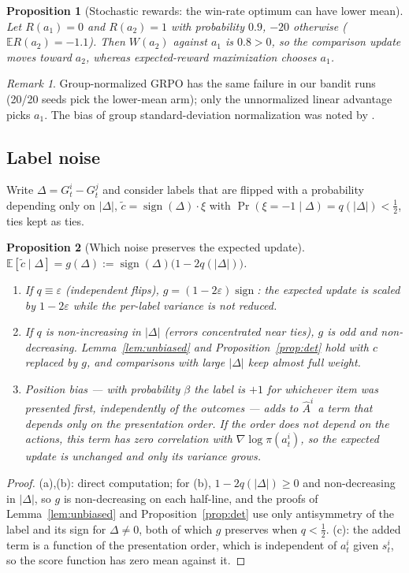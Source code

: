 \documentclass[11pt]{article}
\newtheorem{proposition}{Proposition}
\theoremstyle{remark}
\newtheorem{remark}{Remark}
\newcommand{\sgn}{\operatorname{sign}}
\newcommand{\E}{\mathbb{E}}
\begin{document}
\begin{proposition}[Stochastic rewards: the win-rate optimum can have lower mean]
\label{prop:skew}
Let $R(a_1)=0$ and $R(a_2)=1$ with probability $0.9$, $-20$ otherwise ($\E R(a_2)=-1.1$). Then $W(a_2)$ against $a_1$ is $0.8>0$, so the comparison update moves toward $a_2$, whereas expected-reward maximization chooses $a_1$.
\end{proposition}
\begin{remark}
Group-normalized GRPO has the same failure in our bandit runs (20/20 seeds pick the lower-mean arm); only the unnormalized linear advantage picks $a_1$. The bias of group standard-deviation normalization was noted by \citet{liu2025drgrpo}.
\end{remark}

\subsection{Label noise}
\label{sec:noise}
Write $\Delta=G^i_t-G^j_t$ and consider labels that are flipped with a probability depending only on $|\Delta|$, $\tilde c=\sgn(\Delta)\cdot\xi$ with $\Pr(\xi=-1\mid\Delta)=q(|\Delta|)<\tfrac12$, ties kept as ties.

\begin{proposition}[Which noise preserves the expected update]
\label{prop:noise}
$\E[\tilde c\mid\Delta]=g(\Delta):=\sgn(\Delta)\big(1-2q(|\Delta|)\big)$.
\begin{enumerate}
\item[(a)] If $q\equiv\varepsilon$ (independent flips), $g=(1-2\varepsilon)\sgn$: the expected update is scaled by $1-2\varepsilon$ while the per-label variance is not reduced.
\item[(b)] If $q$ is non-increasing in $|\Delta|$ (errors concentrated near ties), $g$ is odd and non-decreasing. Lemma~\ref{lem:unbiased} and Proposition~\ref{prop:det} hold with $c$ replaced by $g$, and comparisons with large $|\Delta|$ keep almost full weight.
\item[(c)] Position bias --- with probability $\beta$ the label is $+1$ for whichever item was presented first, independently of the outcomes --- adds to $\hat A^i$ a term that depends only on the presentation order. If the order does not depend on the actions, this term has zero correlation with $\nabla\log\pi(a^i_t)$, so the expected update is unchanged and only its variance grows.
\end{enumerate}
\end{proposition}
\begin{proof}
(a),(b): direct computation; for (b), $1-2q(|\Delta|)\ge 0$ and non-decreasing in $|\Delta|$, so $g$ is non-decreasing on each half-line, and the proofs of Lemma~\ref{lem:unbiased} and Proposition~\ref{prop:det} use only antisymmetry of the label and its sign for $\Delta\neq 0$, both of which $g$ preserves when $q<\tfrac12$. (c): the added term is a function of the presentation order, which is independent of $a^i_t$ given $s^i_t$, so the score function has zero mean against it.
\end{proof}
\end{document}

